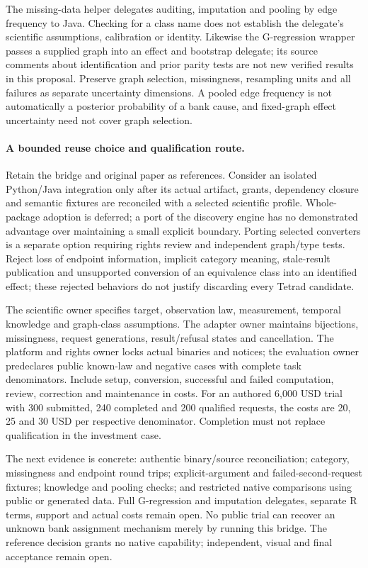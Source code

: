 The missing-data helper delegates auditing, imputation and pooling by edge
frequency to Java. Checking for a class name does not establish the delegate's
scientific assumptions, calibration or identity. Likewise the G-regression
wrapper passes a supplied graph into an effect and bootstrap delegate; its
source comments about identification and prior parity tests are not new
verified results in this proposal. Preserve graph selection, missingness,
resampling units and all failures as separate uncertainty dimensions. A pooled
edge frequency is not automatically a posterior probability of a bank cause,
and fixed-graph effect uncertainty need not cover graph selection.
\citep{exec24_pytetrad_source}

\paragraph{A bounded reuse choice and qualification route.}
Retain the bridge and original paper as references. Consider an isolated
Python/Java integration only after its actual artifact, grants, dependency
closure and semantic fixtures are reconciled with a selected scientific
profile. Whole-package adoption is deferred; a port of the discovery engine
has no demonstrated advantage over maintaining a small explicit boundary.
Porting selected converters is a separate option requiring rights review and
independent graph/type tests. Reject loss of endpoint information, implicit
category meaning, stale-result publication and unsupported conversion of an
equivalence class into an identified effect; these rejected behaviors do not
justify discarding every Tetrad candidate.\citep{exec24_pytetrad_choice}

The scientific owner specifies target, observation law, measurement, temporal
knowledge and graph-class assumptions. The adapter owner maintains bijections,
missingness, request generations, result/refusal states and cancellation. The
platform and rights owner locks actual binaries and notices; the evaluation
owner predeclares public known-law and negative cases with complete task
denominators. Include setup, conversion, successful and failed computation,
review, correction and maintenance in costs. For an authored 6,000 USD trial
with 300 submitted, 240 completed and 200 qualified requests, the costs are
20, 25 and 30 USD per respective denominator. Completion must not replace
qualification in the investment case.\citep{exec24_pytetrad_choice}

The next evidence is concrete: authentic binary/source reconciliation;
category, missingness and endpoint round trips; explicit-argument and
failed-second-request fixtures; knowledge and pooling checks; and restricted
native comparisons using public or generated data. Full G-regression and
imputation delegates, separate R terms, support and actual costs remain open.
No public trial can recover an unknown bank assignment mechanism merely by
running this bridge. The reference decision grants no native capability;
independent, visual and final acceptance remain open.

